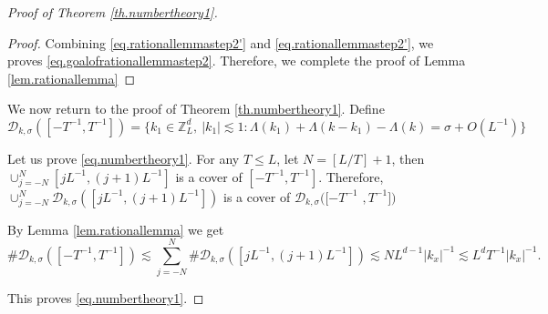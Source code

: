 \begin{proof}[Proof of Theorem \ref{th.numbertheory1}]
\begin{proof}
Combining \eqref{eq.rationallemmastep2'} and \eqref{eq.rationallemmastep2'}, we proves \eqref{eq.goalofrationallemmastep2}. Therefore, we complete the proof of Lemma \ref{lem.rationallemma}
\end{proof}

We now return to the proof of Theorem \ref{th.numbertheory1}. Define 
\begin{equation}
    \mathcal{D}_{k,\sigma}([-T^{-1},T^{-1} ])=\{k_1\in\mathbb{Z}^d_L,\ |k_1|\lesssim 1:\Lambda(k_1)+\Lambda(k-k_1)-\Lambda(k)=\sigma+O(L^{-1})\}
\end{equation}


Let us prove \eqref{eq.numbertheory1}. For any $T\le L$, let $N=[L/T]+1$, then $\cup_{j=-N}^N [jL^{-1}, (j+1)L^{-1}]$ is a cover of $[-T^{-1}, T^{-1}]$. Therefore, $\cup_{j=-N}^N\mathcal{D}_{k,\sigma}([jL^{-1}, (j+1)L^{-1}])$ is a cover of $\mathcal{D}_{k,\sigma}([-T^{-1}$ $,T^{-1} ])$

By Lemma \ref{lem.rationallemma} we get 
\begin{equation}\label{eq.thrationalexpand}
    \#\mathcal{D}_{k,\sigma}([-T^{-1},T^{-1} ])\lesssim \sum_{j=-N}^N\#\mathcal{D}_{k,\sigma}([jL^{-1}, (j+1)L^{-1}])\lesssim NL^{d-1} |k_x|^{-1}\lesssim L^dT^{-1}|k_x|^{-1}.
\end{equation}

This proves \eqref{eq.numbertheory1}.
\end{proof}


